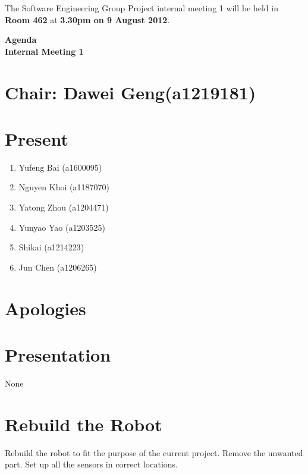 \documentclass[11pt, a4paper]{article}
\begin{document}
\noindent The Software Engineering Group Project internal meeting 1 will be held in {\bf Room 462} at {\bf 3.30pm on 9 August 2012}.


\vspace*{15pt}

\begin{center}
\huge \bf Agenda \\Internal Meeting 1
\end{center}



\section*{Chair: Dawei Geng(a1219181)}
\section*{Present}
\begin{enumerate}
\item Yufeng Bai (a1600095)
\item Nguyen Khoi (a1187070)
\item Yatong Zhou (a1204471)
\item Yunyao Yao (a1203525)
\item Shikai (a1214223)
\item Jun Chen (a1206265)
\end{enumerate}
\section{Apologies}

\section{Presentation}
None

\section{Rebuild the Robot}
Rebuild the robot to fit the purpose of the current project. Remove the unwanted part. Set up all the sensors in correct locations. 
\end{document}
